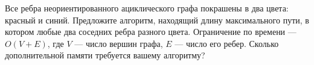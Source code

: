 \documentclass{article}
\begin{document}
Все ребра неориентированного ациклического графа покрашены в два цвета: красный и синий. Предложите алгоритм, находящий длину
максимального пути, в котором любые два соседних ребра разного цвета. Ограничение по времени --- $O(V+E)$, где $V$ --- число
вершин графа, $E$ --- число его ребер. Сколько дополнительной памяти требуется вашему алгоритму?
\end{document}
